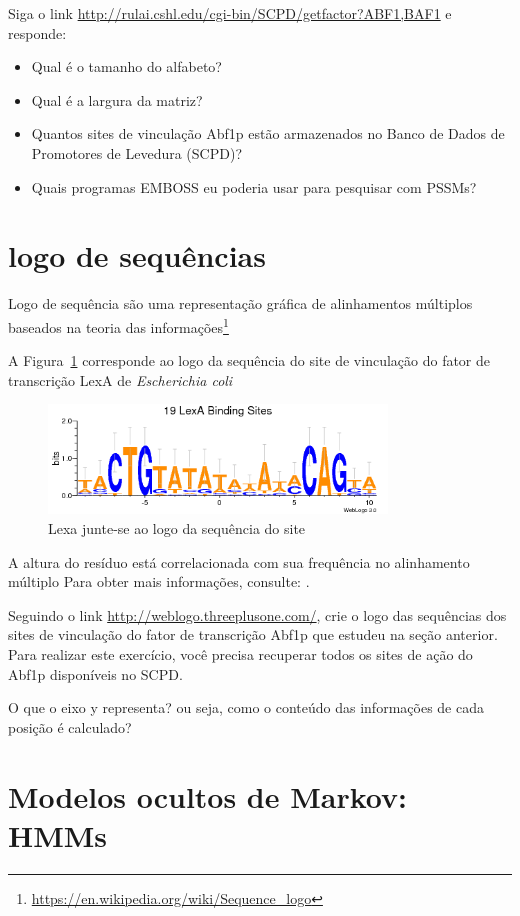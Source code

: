 \documentclass[letter,11pt]{book}
\begin{document}
{\color{red}
Siga o link \url{http://rulai.cshl.edu/cgi-bin/SCPD/getfactor?ABF1,BAF1} e responde:
\begin{itemize}
\item Qual é o tamanho do alfabeto?
\item Qual é a largura da matriz?
\item Quantos sites de vinculação Abf1p estão armazenados no Banco de Dados de Promotores de Levedura (SCPD)?
\item Quais programas EMBOSS eu poderia usar para pesquisar com PSSMs?
\end{itemize}
}

\section{logo de sequências}

Logo de sequência são uma representação gráfica de alinhamentos múltiplos  baseados na teoria das informações\footnote{\url{https://en.wikipedia.org/wiki/Sequence_logo}}

A Figura~\ref{fig:lexALogo} corresponde ao logo da sequência do site de vinculação do fator de transcrição LexA de \textit{Escherichia coli}

\begin{figure}[h!]
\centering
 \includegraphics[width=9cm]{Figs/lexA.png}
 \caption{\label{fig:lexALogo}Lexa junte-se ao logo da sequência do site}
\end{figure}

A altura do resíduo está correlacionada com sua frequência no alinhamento  múltiplo {Para obter mais informações, consulte: \citealp{Schneider1990}}.

{\color{red}
Seguindo o link \url{http://weblogo.threeplusone.com/}, crie o logo das sequências dos sites de vinculação do fator de transcrição Abf1p que estudeu na seção anterior. Para realizar este exercício, você precisa recuperar todos os sites de ação do Abf1p disponíveis no SCPD.

O que o eixo y representa? ou seja, como o conteúdo das informações de cada posição é calculado?
}

\section{Modelos ocultos de Markov: HMMs}
\end{document}

